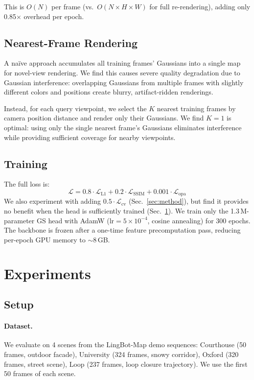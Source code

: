 \documentclass[10pt,twocolumn]{article}
\begin{document}
This is $O(N)$ per frame (vs.\ $O(N \times H \times W)$ for full re-rendering), adding only 0.85$\times$ overhead per epoch.

\subsection{Nearest-Frame Rendering}

A na\"ive approach accumulates all training frames' Gaussians into a single map for novel-view rendering.
We find this causes severe quality degradation due to Gaussian interference: overlapping Gaussians from multiple frames with slightly different colors and positions create blurry, artifact-ridden renderings.

Instead, for each query viewpoint, we select the $K$ nearest training frames by camera position distance and render only their Gaussians.
We find $K{=}1$ is optimal: using only the single nearest frame's Gaussians eliminates interference while providing sufficient coverage for nearby viewpoints.

\subsection{Training}

The full loss is:
\begin{equation}
    \mathcal{L} = 0.8 \cdot \mathcal{L}_{\text{L1}} + 0.2 \cdot \mathcal{L}_{\text{SSIM}} + 0.001 \cdot \mathcal{L}_{\text{opa}}
\end{equation}
We also experiment with adding $0.5 \cdot \mathcal{L}_{\text{cv}}$ (Sec.~\ref{sec:method}), but find it provides no benefit when the head is sufficiently trained (Sec.~\ref{sec:experiments}).
We train only the 1.3\,M-parameter GS head with AdamW ($\text{lr}{=}5{\times}10^{-4}$, cosine annealing) for 300 epochs.
The backbone is frozen after a one-time feature precomputation pass, reducing per-epoch GPU memory to ${\sim}$8\,GB.

\section{Experiments}
\label{sec:experiments}

\subsection{Setup}

\paragraph{Dataset.}
We evaluate on 4 scenes from the LingBot-Map demo sequences:
Courthouse (50 frames, outdoor facade),
University (324 frames, snowy corridor),
Oxford (320 frames, street scene),
Loop (237 frames, loop closure trajectory).
We use the first 50 frames of each scene.
\end{document}
